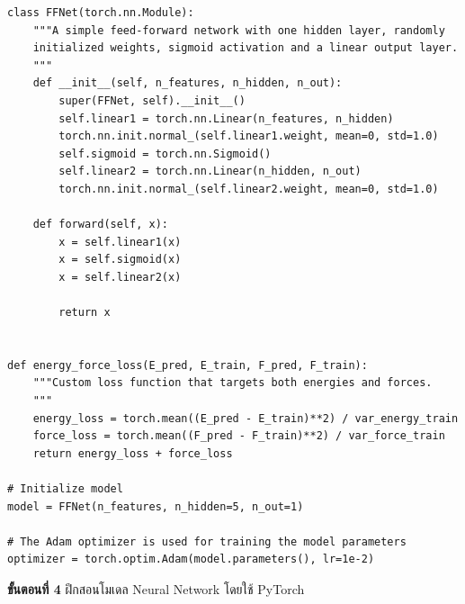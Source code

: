 \begin{lstlisting}[style=MyPython]
class FFNet(torch.nn.Module):
    """A simple feed-forward network with one hidden layer, randomly
    initialized weights, sigmoid activation and a linear output layer.
    """
    def __init__(self, n_features, n_hidden, n_out):
        super(FFNet, self).__init__()
        self.linear1 = torch.nn.Linear(n_features, n_hidden)
        torch.nn.init.normal_(self.linear1.weight, mean=0, std=1.0)
        self.sigmoid = torch.nn.Sigmoid()
        self.linear2 = torch.nn.Linear(n_hidden, n_out)
        torch.nn.init.normal_(self.linear2.weight, mean=0, std=1.0)

    def forward(self, x):
        x = self.linear1(x)
        x = self.sigmoid(x)
        x = self.linear2(x)

        return x


def energy_force_loss(E_pred, E_train, F_pred, F_train):
    """Custom loss function that targets both energies and forces.
    """
    energy_loss = torch.mean((E_pred - E_train)**2) / var_energy_train
    force_loss = torch.mean((F_pred - F_train)**2) / var_force_train
    return energy_loss + force_loss

# Initialize model
model = FFNet(n_features, n_hidden=5, n_out=1)

# The Adam optimizer is used for training the model parameters
optimizer = torch.optim.Adam(model.parameters(), lr=1e-2)
\end{lstlisting}

\vspace{1em}

\textbf{ขั้นตอนที่ 4} ฝึกสอนโมเดล Neural Network โดยใช้ PyTorch

